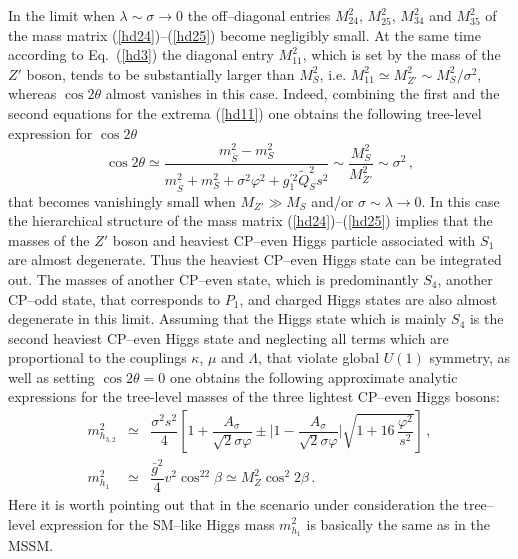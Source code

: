 \documentclass[12pt,a4paper]{article}
\newcommand{\be}{\begin{equation}}
\newcommand{\ee}{\end{equation}}
\newcommand{\ba}{\begin{array}}
\newcommand{\ea}{\end{array}}
\newcommand{\ds}{\displaystyle}
\begin{document}
In the limit when $\lambda \sim \sigma \to 0 $  the off--diagonal entries $M_{24}^2$, $M_{25}^2$, $M_{34}^2$
and $M_{35}^2$ of the mass matrix (\ref{hd24})--(\ref{hd25}) become negligibly small. At the same time
according to Eq.~(\ref{hd3}) the diagonal entry $M_{11}^2$, which is set by the mass of the $Z'$ boson, tends
to be substantially larger than $M_S^2$, i.e. $M_{11}^2\simeq M_{Z'}^2 \sim M_S^2/\sigma^2$, whereas
$\cos 2\theta$ almost vanishes in this case. Indeed, combining the first and the second equations for the extrema
(\ref{hd11}) one obtains the following tree-level expression for $\cos 2\theta$
\be
\cos 2\theta \simeq
\dfrac{m_{\overline{S}}^2-m_{S}^2}{m_{\overline{S}}^2+m_S^2+\sigma^2\varphi^2+g^{'2}_1 \tilde{Q}_S^2 s^2}
\sim \dfrac{M_S^2}{M_{Z'}^2}\sim \sigma^2\,,
\label{hd27}
\ee
that becomes vanishingly small when $M_{Z'}\gg M_S$ and/or $\sigma\sim \lambda\to 0$. In this case the  hierarchical structure
of the mass matrix (\ref{hd24})--(\ref{hd25}) implies that the masses of the $Z'$ boson and  heaviest CP--even Higgs particle
associated with $S_1$ are almost degenerate. Thus the heaviest CP--even Higgs state can be integrated out. The masses of
another CP--even state, which is predominantly $S_4$, another CP--odd state, that corresponds to $P_1$, and charged Higgs states
are also almost degenerate in this limit. Assuming that the Higgs state which is mainly $S_4$ is the second heaviest CP--even Higgs
state and neglecting all terms which are proportional to the couplings $\kappa$, $\mu$ and $\Lambda$, that violate global $U(1)$
symmetry, as well as setting $\cos 2\theta=0$ one obtains the following approximate analytic expressions for the tree-level
masses of the three lightest CP--even Higgs bosons:
\be
\ba{lcl}
m_{h_{3,2}}^2 & \simeq & \dfrac{\sigma^2 s^2}{4}\left[1+\dfrac{A_{\sigma}}{\sqrt{2}\sigma \varphi} \pm
\biggl|1 - \dfrac{A_{\sigma}}{\sqrt{2}\sigma \varphi}\biggr|\sqrt{1+16\,\dfrac{\varphi^2}{s^2}}\right]\,,\\[2mm]
m_{h_{1}}^2 & \simeq & \dfrac{\bar{g}^2}{4}v^2\cos^22\beta\simeq M_{Z}^2 \cos^2 2\beta\,.
\ea
\label{hd28}
\ee
Here it is worth pointing out that in the scenario under consideration the tree--level expression for the SM--like Higgs mass
$m_{h_{1}}^2$ is basically the same as in the MSSM.






\end{document}
